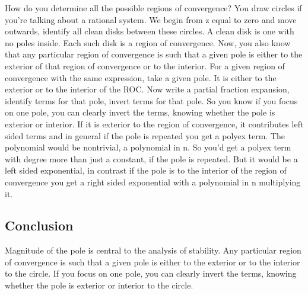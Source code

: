 How do you determine all the possible regions of convergence? You draw circles if you’re talking about a rational system. We begin from z equal to zero and move outwards, identify all clean disks between these circles. A clean disk is one with no poles inside. Each such disk is a region of convergence. Now, you also know that any particular region of convergence is such that a given pole is either to the exterior of that region of convergence or to the interior. For a given region of convergence with the same expression, take a given pole. It is either to the exterior or to the interior of the ROC. Now write a partial fraction expansion, identify terms for that pole, invert terms for that pole. So you know if you focus on one pole, you can clearly invert the terms, knowing whether the pole is exterior or interior. If it is exterior to the region of convergence, it contributes left sided terms and in general if the pole is repeated you get a polyex term. The polynomial would be nontrivial, a polynomial in n. So you’d get a polyex term with degree more than just a constant, if the pole is repeated. But it would be a left sided exponential, in contrast if the pole is to the interior of the region of convergence you get a right sided exponential with a polynomial in n multiplying it.\\

\subsection{Conclusion}
Magnitude of the pole is central to the analysis of stability. Any particular region of convergence is such that a given pole is either to the exterior or to the interior to the circle. If you focus on one pole, you can clearly invert the terms, knowing whether the pole is exterior or interior to the circle.






